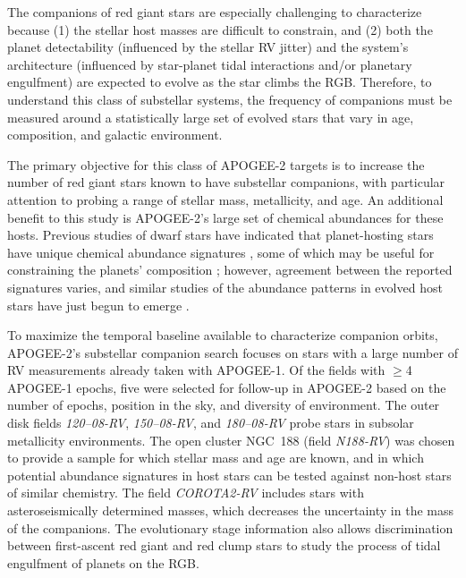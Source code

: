 \documentclass[12pt,twocolumn]{emulateapj}
\begin{document}
The companions of red giant stars are especially challenging to characterize because (1) the stellar host masses are difficult to constrain, and (2) both the planet detectability (influenced by the stellar RV jitter) and the system's architecture (influenced by star-planet tidal interactions and/or planetary engulfment) are expected to evolve as the star climbs the RGB. Therefore, to understand this class of substellar systems, the frequency of companions must be measured around a statistically large set of evolved stars that vary in age, composition, and galactic environment.

The primary objective for this class of APOGEE-2 targets is to increase the number of red giant stars known to have substellar companions, with particular attention to probing a range of stellar mass, metallicity, and age.  An additional benefit to this study is APOGEE-2's large set of chemical abundances for these hosts.  Previous studies of dwarf stars have indicated that planet-hosting stars have unique chemical abundance signatures \citep[e.g.,][]{Adibekyan_2012_planethostabundances}, some of which may be useful for constraining the planets' composition \citep[e.g.,][]{DelgadoMena_2010_planetabundances}; however, agreement between the reported signatures varies, and similar studies of the abundance patterns in evolved host stars have just begun to emerge \citep{Jofre_2015_evolvedhostabundances,Maldonado_2016_evolvedhostabundances}.

To maximize the temporal baseline available to characterize companion orbits, APOGEE-2's substellar companion search focuses on stars with a large number of RV measurements already taken with APOGEE-1.  Of the fields with $\geq$4 APOGEE-1 epochs, five were selected for follow-up in APOGEE-2 based on the number of epochs, position in the sky, and diversity of environment.  The outer disk fields {\it 120--08-RV}, {\it 150--08-RV}, and {\it 180--08-RV} probe stars in subsolar metallicity environments.  The open cluster NGC~188 (field {\it N188-RV}) was chosen to provide a sample for which stellar mass and age are known, and in which potential abundance signatures in host stars can be tested against non-host stars of similar chemistry.  The field {\it COROTA2-RV} includes stars with asteroseismically determined masses, which decreases the uncertainty in the mass of the companions.  The evolutionary stage information also allows discrimination between first-ascent red giant and red clump stars to study the process of tidal engulfment of planets on the RGB. 
\end{document}
